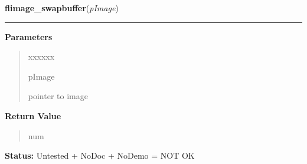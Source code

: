 \hspace{.8\funcindent}\begin{boxedminipage}{\funcwidth}

    \raggedright \textbf{flimage\_swapbuffer}(\textit{pImage})

    \vspace{-1.5ex}

    \rule{\textwidth}{0.5\fboxrule}
\setlength{\parskip}{2ex}
\setlength{\parskip}{1ex}
      \textbf{Parameters}
      \vspace{-1ex}

      \begin{quote}
        \begin{Ventry}{xxxxxx}

          \item[pImage]

          pointer to image

        \end{Ventry}

      \end{quote}

      \textbf{Return Value}
    \vspace{-1ex}

      \begin{quote}
      num

      \end{quote}

\textbf{Status:} Untested + NoDoc + NoDemo = NOT OK



    \end{boxedminipage}

    \label{xformslib:flflimage:flimage_to_ximage}

    \vspace{0.5ex}

